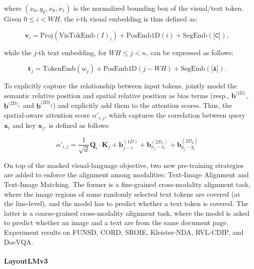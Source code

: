 \noindent where $(x_0, y_0, x_0, x_1)$ is the normalized bounding box of the visual/text token. Given $0 \leq i < WH$, the $i$-th visual embedding is thus defined as:

\begin{equation}
    \bm{v}_i = \text{Proj}\left(\text{VisTokEmb}(I)_i\right) + \text{PosEmb1D}(i) + \text{SegEmb}(\texttt{[C]}),
\end{equation}

\noindent while the $j$-th text embedding, for $WH \leq j < n$, can be expressed as follows:

\begin{equation}
    \bm{t}_j = \text{TokenEmb}\left(w_j\right) + \text{PosEmb1D}(j-WH) + \text{SegEmb}(\texttt{[A]}).
\end{equation}

\noindent To explicitly capture the relationship between input tokens, \citet{xu2020layoutlmv2} jointly model the semantic relative position and spatial relative position as bias terms (resp., $\bm{b}^{\text{(1D)}}$, $\bm{b}^{\text{(2D)}_x}$ and $\bm{b}^{\text{(2D)}_y}$) and explicitly add them to the attention scores. Thus, the spatial-aware attention score $\alpha'_{i,j}$, which captures the correlation between query $\bm{x}_i$ and key $\bm{x}_j$, is defined as follows:

\begin{equation}
    \alpha'_{i,j} = \dfrac{1}{\sqrt{d}} \bm{Q}_i \cdot \bm{K}_j + \bm{b}^{(1D)}_{j - i} + \bm{b}^{(2D_x)}_{x_j - x_i} + \bm{b}^{(2D_y)}_{y_j - y_i}
\end{equation}

\noindent On top of the masked visual-language objective, two new pre-training strategies are added to enforce the alignment among modalities: Text-Image Alignment and Text-Image Matching. The former is a fine-grained cross-modality alignment task, where the image regions of some randomly selected text tokens are covered (at the line-level), and the model has to predict whether a text token is covered. The latter is a coarse-grained cross-modality alignment task, where the model is asked to predict whether an image and a text are from the same document page. Experiment results on FUNSD, CORD, SROIE, Kleister-NDA, RVL-CDIP, and DocVQA.

\paragraph{LayoutLMv3}

